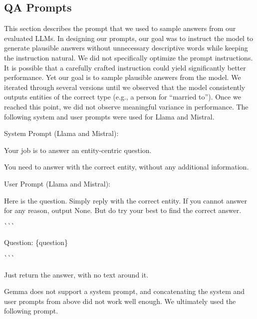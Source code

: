 



\subsection{QA Prompts}
\label{sec:qa_prompts}
This section describes the prompt that we used to sample answers from our evaluated LLMs.
In designing our prompts, our goal was to instruct the model to generate plausible answers without unnecessary descriptive words while keeping the instruction natural. 
We did not specifically optimize the prompt instructions. It is possible that a carefully crafted instruction could yield significantly better performance. Yet our goal is to sample plausible answers from the model. We iterated through several versions until we observed that the model consistently outputs entities of the correct type (e.g., a person for ``married to''). Once we reached this point, we did not observe meaningful variance in performance. The following system and user prompts were used for Llama and Mistral.

System Prompt (Llama and Mistral): 
\begin{mdframed}[backgroundcolor=blue!5, skipabove=0.5\baselineskip]
\small

\noindent Your job is to answer an entity-centric question.

You need to answer with the correct entity, without any additional information.

\end{mdframed}
\vspace{0.5\baselineskip}


User Prompt (Llama and Mistral):
\begin{mdframed}[backgroundcolor=blue!5, skipabove=0.5\baselineskip]
\small

\noindent Here is the question. Simply reply with the correct entity. If you cannot answer for any reason, output None. But do try your best to find the correct answer.


\verb|```|

Question: \{question\}

\verb|```|

Just return the answer, with no text around it.
\end{mdframed}
\vspace{0.5\baselineskip}


Gemma does not support a system prompt, and concatenating the system and user prompts from above did not work well enough. We ultimately used the following prompt.

